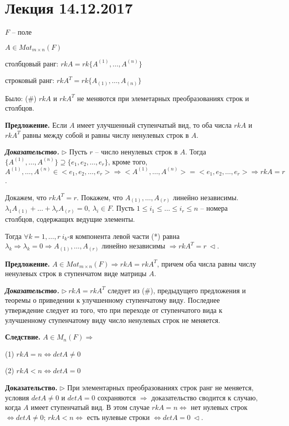 \section{Лекция 14.12.2017}

$F$ -- поле

$A \in Mat_{m \times n} (F)$

столбцовый ранг: $rkA = rk\{A^{(1)}, \dots, A^{(n)}\}$

строковый ранг: $rkA^T = rk\{A_{(1)}, \dots, A_{(n)}\}$

Было: (\#) $rkA$ и $rkA^T$ не меняются при элеметарных преобразованиях строк и столбцов.

\bigskip
\textbf{Предложение.} Если $A$ имеет улучшенный ступенчатый вид, то оба числа $rkA$ и $rkA^T$ равны между собой и равны числу ненулевых строк в $A$.

\bigskip
\textbf{\textit{Доказательство.}} $\rhd$ Пусть $r$ -- число ненулевых строк в $A$. Тогда $\{A^{(1)}, \dots, A^{(n)}\} \supseteq \{e_1, e_2, \dots, e_r\}$, кроме того, $A^{(1)}, \dots, A^{(n)} \in <e_1, e_2, \dots, e_r> \Rightarrow <A^{(1)}, \dots, A^{(n)}> = <e_1, e_2, \dots, e_r> \Rightarrow rkA = r$.

\bigskip
Докажем, что $rkA^T = r$. Покажем, что $A_{(1)}, \dots, A_{(r)}$ линейно независимы. $\lambda_1 A_{(1)} + \dots + \lambda_r A_{(r)} = 0, \ \lambda_i \in F$. Пусть $1 \leq i_1 \leq \dots \leq i_r \leq n$ -- номера столбцов, содержащих ведущие элементы.

Тогда $\forall k = 1, \dots, r \ i_k$-я компонента левой части (*) равна $\lambda_k \Rightarrow \lambda_k = 0 \Rightarrow A_{(1)}, \dots, A_{(r)}$ линейно независимы $\Rightarrow rkA^T = r \ \lhd$.

\bigskip
\textbf{Предложение.} $A \in Mat_{m \times n} (F) \Rightarrow rkA = rkA^T$, причем оба числа равны числу ненулевых строк в ступенчатом виде матрицы $A$.

\bigskip
\textbf{\textit{Доказательство.}} $\rhd \ rkA = rkA^T$ следует из (\#), предыдущего предложения и теоремы о приведении к улучшенному ступенчатому виду. Последнее утверждение следует из того, что при переходе от ступенчатого вида к улучшенному ступенчатому виду число ненулевых строк не меняется.

\bigskip
\textbf{Следствие.} $A \in M_n (F) \Rightarrow$

(1) $rkA = n \Leftrightarrow detA \neq 0$

(2) $rkA < n \Leftrightarrow detA = 0$

\bigskip
\textbf{Доказательство.} $\rhd$ При элементарных преобразованиях строк ранг не меняется, условия $detA \neq 0$ и $detA = 0$ сохраняются $\Rightarrow$ доказательство сводится к случаю, когда $A$ имеет ступенчатый вид. В этом случае $rkA = n \Leftrightarrow$ нет нулевых строк $\Leftrightarrow detA \neq 0$; $rkA < n \Leftrightarrow$ есть нулевые строки $\Leftrightarrow detA = 0 \ \lhd$.

